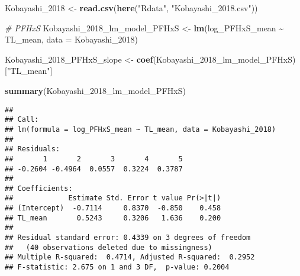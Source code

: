 \documentclass[
]{article}
\newenvironment{Shaded}{\begin{snugshade}}{\end{snugshade}}
\newcommand{\AttributeTok}[1]{\textcolor[rgb]{0.13,0.29,0.53}{#1}}
\newcommand{\CommentTok}[1]{\textcolor[rgb]{0.56,0.35,0.01}{\textit{#1}}}
\newcommand{\FunctionTok}[1]{\textcolor[rgb]{0.13,0.29,0.53}{\textbf{#1}}}
\newcommand{\NormalTok}[1]{#1}
\newcommand{\OtherTok}[1]{\textcolor[rgb]{0.56,0.35,0.01}{#1}}
\newcommand{\SpecialCharTok}[1]{\textcolor[rgb]{0.81,0.36,0.00}{\textbf{#1}}}
\newcommand{\StringTok}[1]{\textcolor[rgb]{0.31,0.60,0.02}{#1}}
\begin{document}
\begin{Shaded}
\begin{Highlighting}[]
\NormalTok{Kobayashi\_2018 }\OtherTok{\textless{}{-}} \FunctionTok{read.csv}\NormalTok{(}\FunctionTok{here}\NormalTok{(}\StringTok{"Rdata"}\NormalTok{, }\StringTok{"Kobayashi\_2018.csv"}\NormalTok{))}

\CommentTok{\# PFHxS}
\NormalTok{Kobayashi\_2018\_lm\_model\_PFHxS }\OtherTok{\textless{}{-}} \FunctionTok{lm}\NormalTok{(log\_PFHxS\_mean }\SpecialCharTok{\textasciitilde{}}\NormalTok{ TL\_mean,}
                                    \AttributeTok{data =}\NormalTok{ Kobayashi\_2018)}

\NormalTok{Kobayashi\_2018\_PFHxS\_slope }\OtherTok{\textless{}{-}} \FunctionTok{coef}\NormalTok{(Kobayashi\_2018\_lm\_model\_PFHxS)[}\StringTok{"TL\_mean"}\NormalTok{]}

\FunctionTok{summary}\NormalTok{(Kobayashi\_2018\_lm\_model\_PFHxS)}
\end{Highlighting}
\end{Shaded}

\begin{verbatim}
## 
## Call:
## lm(formula = log_PFHxS_mean ~ TL_mean, data = Kobayashi_2018)
## 
## Residuals:
##       1       2       3       4       5 
## -0.2604 -0.4964  0.0557  0.3224  0.3787 
## 
## Coefficients:
##             Estimate Std. Error t value Pr(>|t|)
## (Intercept)  -0.7114     0.8370  -0.850    0.458
## TL_mean       0.5243     0.3206   1.636    0.200
## 
## Residual standard error: 0.4339 on 3 degrees of freedom
##   (40 observations deleted due to missingness)
## Multiple R-squared:  0.4714, Adjusted R-squared:  0.2952 
## F-statistic: 2.675 on 1 and 3 DF,  p-value: 0.2004
\end{verbatim}
\end{document}
